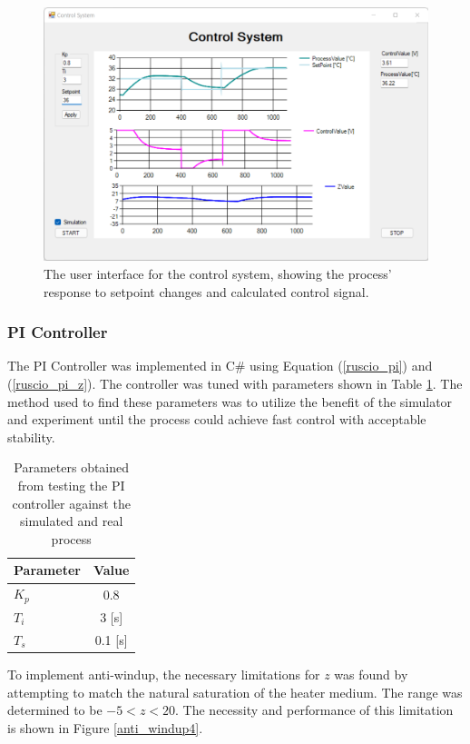 \documentclass[conference]{IEEEtran}
\begin{document}
\begin{figure}[H]
    \centering
    \includegraphics[scale=0.38]{media/control_system.png}
    \caption{The user interface for the control system, showing the process' response to setpoint changes and calculated control signal. }
    \label{control_system}    
\end{figure}

\subsubsection{PI Controller}
The PI Controller was implemented in C\# using Equation (\ref{ruscio_pi}) and (\ref{ruscio_pi_z}). The controller was tuned with parameters shown in Table \ref{pid_params}. The method used to find these parameters was to utilize the benefit of the simulator and experiment until the process could achieve fast control with acceptable stability.

\begin{table}[H]
    \centering
    \begin{tabular}{ |l|c| }
        \hline
        Parameter & Value \\ 
        \hline \hline
        $K_p$ & 0.8\\
        $T_i$ & 3 [s] \\
        $T_s$ & 0.1 [s]\\
        \hline
    \end{tabular}
    \vspace{5pt}
    \caption{Parameters obtained from testing the PI controller against the simulated and real process}
    \label{pid_params}
\end{table}

To implement anti-windup, the necessary limitations for $z$ was found by attempting to match the natural saturation of the heater medium. The range was determined to be $-5<z<20$. The necessity and performance of this limitation is shown in Figure \ref{anti_windup4}.
\end{document}
